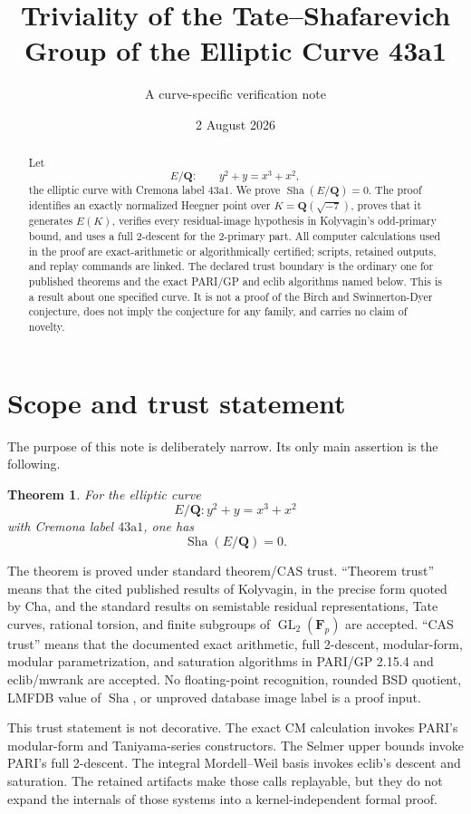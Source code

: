 \documentclass[11pt]{article}
\title{Triviality of the Tate--Shafarevich Group of the Elliptic Curve 43a1}
\author{A curve-specific verification note}
\date{2 August 2026}
\newtheorem{theorem}{Theorem}
\newcommand{\Q}{\mathbf Q}
\newcommand{\F}{\mathbf F}
\newcommand{\Sha}{\mathop{\mathrm{Sha}}}
\begin{document}
\maketitle

\begin{abstract}
Let
\[
 E/\Q:\qquad y^2+y=x^3+x^2,
\]
the elliptic curve with Cremona label \(43\mathrm a1\).  We prove
\(\Sha(E/\Q)=0\).  The proof identifies an exactly normalized Heegner point
over \(K=\Q(\sqrt{-7})\), proves that it generates \(E(K)\), verifies every
residual-image hypothesis in Kolyvagin's odd-primary bound, and uses a full
2-descent for the 2-primary part.  All computer calculations used in the
proof are exact-arithmetic or algorithmically certified; scripts, retained
outputs, and replay commands are linked.
The declared trust boundary is the ordinary one for published theorems and
the exact PARI/GP and eclib algorithms named below.  This is a result about
one specified curve.  It is not a proof of the Birch and Swinnerton-Dyer
conjecture, does not imply the conjecture for any family, and carries no claim
of novelty.
\end{abstract}

\section{Scope and trust statement}

The purpose of this note is deliberately narrow.  Its only main assertion is
the following.

\begin{theorem}\label{thm:main}
For the elliptic curve
\[
 E/\Q:y^2+y=x^3+x^2
\]
with Cremona label \(43\mathrm a1\), one has
\[
 \Sha(E/\Q)=0.
\]
\end{theorem}

The theorem is proved under standard theorem/CAS trust.  ``Theorem trust''
means that the cited published results of Kolyvagin, in the precise form
quoted by Cha, and the standard results on semistable residual
representations, Tate curves, rational torsion, and finite subgroups of
\(\operatorname{GL}_2(\F_p)\) are accepted.  ``CAS trust'' means that the
documented exact arithmetic, full 2-descent, modular-form, modular
parametrization, and saturation algorithms in PARI/GP 2.15.4 and eclib/mwrank
are accepted.  No floating-point recognition, rounded BSD quotient, LMFDB
value of \(\Sha\), or unproved database image label is a proof input.

This trust statement is not decorative.  The exact CM calculation invokes
PARI's modular-form and Taniyama-series constructors.  The Selmer upper bounds
invoke PARI's full 2-descent.  The integral Mordell--Weil basis invokes eclib's
descent and saturation.  The retained artifacts make those calls replayable,
but they do not expand the internals of those systems into a kernel-independent
formal proof.
\end{document}
